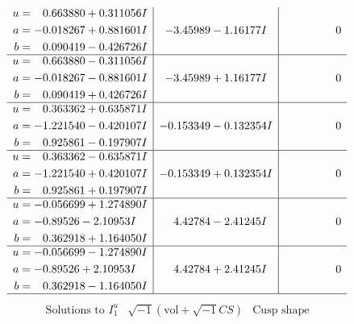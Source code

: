 \documentclass[1p]{elsarticle_modified}
\theoremstyle{definition}
\newcommand{\I}{\sqrt{-1}}
\begin{document}
$$\begin{array}{c|c|c}
\begin{aligned}
u &= \phantom{-}0.663880 + 0.311056 I \\
a &= -0.018267 + 0.881601 I \\
b &= \phantom{-}0.090419 - 0.426726 I\end{aligned}
 & -3.45989 - 1.16177 I & \phantom{-0.000000 } 0 \\ \hline\begin{aligned}
u &= \phantom{-}0.663880 - 0.311056 I \\
a &= -0.018267 - 0.881601 I \\
b &= \phantom{-}0.090419 + 0.426726 I\end{aligned}
 & -3.45989 + 1.16177 I & \phantom{-0.000000 } 0 \\ \hline\begin{aligned}
u &= \phantom{-}0.363362 + 0.635871 I \\
a &= -1.221540 - 0.420107 I \\
b &= \phantom{-}0.925861 - 0.197907 I\end{aligned}
 & -0.153349 - 0.132354 I & \phantom{-0.000000 } 0 \\ \hline\begin{aligned}
u &= \phantom{-}0.363362 - 0.635871 I \\
a &= -1.221540 + 0.420107 I \\
b &= \phantom{-}0.925861 + 0.197907 I\end{aligned}
 & -0.153349 + 0.132354 I & \phantom{-0.000000 } 0 \\ \hline\begin{aligned}
u &= -0.056699 + 1.274890 I \\
a &= -0.89526 - 2.10953 I \\
b &= \phantom{-}0.362918 + 1.164050 I\end{aligned}
 & \phantom{-}4.42784 - 2.41245 I & \phantom{-0.000000 } 0 \\ \hline\begin{aligned}
u &= -0.056699 - 1.274890 I \\
a &= -0.89526 + 2.10953 I \\
b &= \phantom{-}0.362918 - 1.164050 I\end{aligned}
 & \phantom{-}4.42784 + 2.41245 I & \phantom{-0.000000 } 0\\
 \hline 
 \end{array}$$\newpage$$\begin{array}{c|c|c}  
\text{Solutions to }I^u_{1}& \I (\text{vol} + \sqrt{-1}CS) & \text{Cusp shape}\\
 \hline 
\begin{aligned}

\end{aligned}
\end{array}$$
\end{document}
